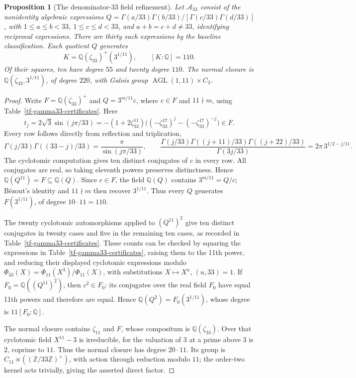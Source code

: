 \documentclass[11pt,a4paper]{article}
\newtheorem{proposition}[theorem]{Proposition}
\theoremstyle{definition}
\theoremstyle{remark}
\numberwithin{equation}{section}
\begin{document}
\begin{proposition}[The denominator-$33$ field refinement]
\label{tf-gamma33}
Let $\mathcal A_{33}$ consist of the nonidentity algebraic expressions
$Q=\Gamma(a/33)\Gamma(b/33)/[\Gamma(c/33)\Gamma(d/33)]$, with
$1\le a\le b<33$, $1\le c\le d<33$, and $a+b=c+d\ne33$,
identifying reciprocal expressions.  There are thirty such expressions
by the baseline classification.  Each quotient
$Q$ generates
\[
 K=\mathbb Q(\zeta_{33})^+(3^{1/11}),\qquad [K:\mathbb Q]=110.
\]
Of their squares, ten have degree $55$ and twenty degree $110$.
The normal closure is
$\mathbb Q(\zeta_{33},3^{1/11})$, of degree $220$, with Galois group
$\operatorname{AGL}(1,11)\times C_2$.
\end{proposition}
\begin{proof}
Write $F=\mathbb Q(\zeta_{33})^+$ and
$Q=3^{m/11}c$, where $c\in F$ and $11\nmid m$, using
Table~\ref{tf-gamma33-certificates}.  Here
\[
 t_j=2\sqrt3\sin(j\pi/33)
 =-(1+2\zeta_{33}^{11})
   \bigl((-\zeta_{33}^{17})^j-(-\zeta_{33}^{17})^{-j}\bigr)\in F.
\]
Every row follows directly from reflection and triplication,
\[
 \Gamma(j/33)\Gamma((33-j)/33)=\frac\pi{\sin(j\pi/33)},\qquad
 \frac{\Gamma(j/33)\Gamma((j+11)/33)\Gamma((j+22)/33)}
 {\Gamma(3j/33)}=2\pi\,3^{1/2-j/11}.
\]
The cyclotomic computation gives ten distinct conjugates of $c$ in
every row.  All conjugates are real, so taking eleventh powers preserves
distinctness.  Hence $\mathbb Q(Q^{11})=F\subseteq\mathbb Q(Q)$.
Since $c\in F$, the field $\mathbb Q(Q)$ contains $3^{m/11}=Q/c$;
B\'ezout's identity and $11\nmid m$ then recover $3^{1/11}$.
Thus every $Q$ generates $F(3^{1/11})$, of degree $10\cdot11=110$.

The twenty cyclotomic automorphisms applied to
$(Q^{11})^2$ give ten distinct conjugates in twenty cases and five in
the remaining ten cases, as recorded in Table~\ref{tf-gamma33-certificates}.
These counts can be checked by squaring the expressions in
Table~\ref{tf-gamma33-certificates}, raising them to the 11th power,
and reducing their displayed cyclotomic expressions modulo
$\Phi_{33}(X)=\Phi_{11}(X^3)/\Phi_{11}(X)$, with substitutions
$X\mapsto X^u$, $(u,33)=1$.  If $F_0=\mathbb Q((Q^{11})^2)$,
then $c^2\in F_0$: its conjugates over the real field $F_0$ have equal
11th powers and therefore are equal.  Hence
$\mathbb Q(Q^2)=F_0(3^{1/11})$, whose degree is $11[F_0:\mathbb Q]$.

The normal closure contains $\zeta_{11}$ and $F$, whose compositum is
$\mathbb Q(\zeta_{33})$.  Over that cyclotomic field $X^{11}-3$ is
irreducible, for the valuation of $3$ at a prime above $3$ is $2$,
coprime to $11$.  Thus the normal closure has degree $20\cdot11$.
Its group is $C_{11}\rtimes((\mathbb Z/33\mathbb Z)^\times)$,
with action through reduction modulo $11$; the order-two kernel acts
trivially, giving the asserted direct factor.
\end{proof}
\end{document}
